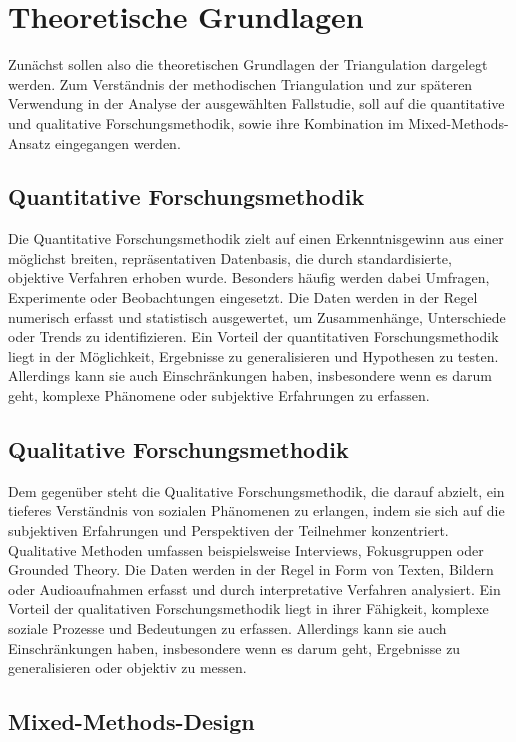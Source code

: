 \section{Theoretische Grundlagen}

Zunächst sollen also die theoretischen Grundlagen der Triangulation dargelegt werden. Zum Verständnis der methodischen Triangulation und zur späteren Verwendung in der Analyse der ausgewählten Fallstudie, soll auf die quantitative und qualitative Forschungsmethodik, sowie ihre Kombination im Mixed-Methods-Ansatz eingegangen werden.

\subsection{Quantitative Forschungsmethodik}

Die Quantitative Forschungsmethodik zielt auf einen Erkenntnisgewinn aus einer möglichst breiten, repräsentativen Datenbasis, die durch standardisierte, objektive Verfahren erhoben wurde. Besonders häufig werden dabei Umfragen, Experimente oder Beobachtungen eingesetzt. Die Daten werden in der Regel numerisch erfasst und statistisch ausgewertet, um Zusammenhänge, Unterschiede oder Trends zu identifizieren. Ein Vorteil der quantitativen Forschungsmethodik liegt in der Möglichkeit, Ergebnisse zu generalisieren und Hypothesen zu testen. Allerdings kann sie auch Einschränkungen haben, insbesondere wenn es darum geht, komplexe Phänomene oder subjektive Erfahrungen zu erfassen.

\subsection{Qualitative Forschungsmethodik}

Dem gegenüber steht die Qualitative Forschungsmethodik, die darauf abzielt, ein tieferes Verständnis von sozialen Phänomenen zu erlangen, indem sie sich auf die subjektiven Erfahrungen und Perspektiven der Teilnehmer konzentriert. Qualitative Methoden umfassen beispielsweise Interviews, Fokusgruppen oder Grounded Theory. Die Daten werden in der Regel in Form von Texten, Bildern oder Audioaufnahmen erfasst und durch interpretative Verfahren analysiert. Ein Vorteil der qualitativen Forschungsmethodik liegt in ihrer Fähigkeit, komplexe soziale Prozesse und Bedeutungen zu erfassen. Allerdings kann sie auch Einschränkungen haben, insbesondere wenn es darum geht, Ergebnisse zu generalisieren oder objektiv zu messen.

\subsection{Mixed-Methods-Design}

